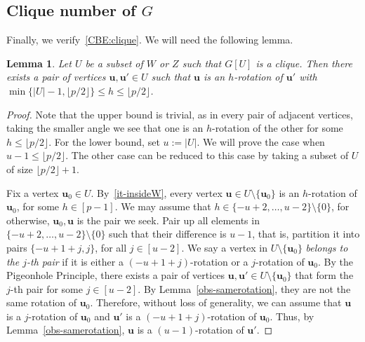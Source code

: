 \documentclass[10pt,a4paper]{article}
\newcommand{\V}[1]{\mathbold{#1}}
\newtheorem{lemma}[theorem]{Lemma}
\theoremstyle{definition}
\newcommand{\floor}[1]{\lfloor{#1}\rfloor}
\begin{document}
 
\subsection{Clique number of $G$}
Finally, we verify~\ref{CBE:clique}. 
We will need the following lemma. 

\begin{lemma}\label{lem-farpairs}
	Let $U$ be a subset of $W$ or $Z$ such that $G[U]$ is a clique. Then there exists a pair of vertices $\V{u},\V{u}'\in U$ such that $\V{u}$ is an $h$-rotation of $\V{u}'$ with $\min\{|U|-1, \floor{p/2}\}\le h\le \floor{p/2}$.
\end{lemma}
\begin{proof}
	Note that the upper bound is trivial, as in every pair of adjacent vertices, taking the smaller angle we see that one is an $h$-rotation of the other for some $h\le \floor{p/2}$. For the lower bound, set $u:=|U|$. We will prove the case when $u-1\le \floor{p/2}$. The other case can be reduced to this case by taking a subset of $U$ of size $\floor{p/2}+1$. 
	
	Fix a vertex $\V{u}_0\in U$. By~\ref{it-insideW},  every vertex $\V{u}\in U\setminus\{\V{u}_0\}$ is an $h$-rotation of $\V{u}_0$, for some $h\in[p-1]$. We may assume that $h\in \{-u+2,\ldots,u-2\}\setminus\{0\}$, for otherwise, $\V{u}_0,\V{u}$ is the pair we seek. Pair up all elements in $\{-u+2,\ldots,u-2\}\setminus\{0\}$ such that their difference is $u-1$, that is, partition it into pairs $\{-u+1+j,j\}$, for all $j\in [u-2]$. We say a vertex in $U\setminus\{\V{u}_0\}$ \emph{belongs to the $j$-th pair} if it is either a $(-u+1+j)$-rotation or a $j$-rotation of $\V{u}_0$. By the Pigeonhole Principle, there exists a pair of vertices $\V{u},\V{u}'\in U\setminus\{\V{u}_0\}$ that form the $j$-th pair for some $j\in[u-2]$. By Lemma~\ref{obs-samerotation}, they are not the same rotation of $\V{u}_0$. Therefore, without loss of generality, we can assume that $\V{u}$ is a $j$-rotation of $\V{u}_0$ and $\V{u}'$ is a $(-u+1+j)$-rotation of $\V{u}_0$. Thus, by Lemma~\ref{obs-samerotation}, $\V{u}$ is a $(u-1)$-rotation of $\V{u}'$.
\end{proof}
\end{document}
